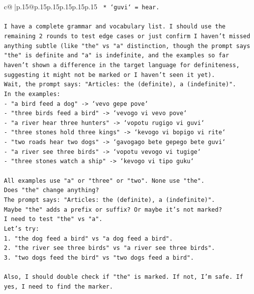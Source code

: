 \documentclass{article}
\begin{document}
{\begin{supertabular}{c@{$\;$}|p{.15\linewidth}@{}p{.15\linewidth}p{.15\linewidth}p{.15\linewidth}p{.15\linewidth}p{.15\linewidth}}
{{{\texttt{    *   `guvi` = hear.} \\
\\ 
\texttt{I have a complete grammar and vocabulary list. I should use the remaining 2 rounds to test edge cases or just confirm I haven't missed anything subtle (like "the" vs "a" distinction, though the prompt says "the" is definite and "a" is indefinite, and the examples so far haven't shown a difference in the target language for definiteness, suggesting it might not be marked or I haven't seen it yet).} \\
\texttt{Wait, the prompt says: "Articles: the (definite), a (indefinite)".} \\
\texttt{In the examples:} \\
\texttt{{-} "a bird feed a dog" {-}> `vevo gepe pove`} \\
\texttt{{-} "three birds feed a bird" {-}> `vevogo vi vevo pove`} \\
\texttt{{-} "a river hear three hunters" {-}> `vopotu rugigo vi guvi`} \\
\texttt{{-} "three stones hold three kings" {-}> `kevogo vi bopigo vi rite`} \\
\texttt{{-} "two roads hear two dogs" {-}> `gavogago bete gepego bete guvi`} \\
\texttt{{-} "a river see three birds" {-}> `vopotu vevogo vi tugige`} \\
\texttt{{-} "three stones watch a ship" {-}> `kevogo vi tipo guku`} \\
\\ 
\texttt{All examples use "a" or "three" or "two". None use "the".} \\
\texttt{Does "the" change anything?} \\
\texttt{The prompt says: "Articles: the (definite), a (indefinite)".} \\
\texttt{Maybe "the" adds a prefix or suffix? Or maybe it's not marked?} \\
\texttt{I need to test "the" vs "a".} \\
\texttt{Let's try:} \\
\texttt{1. "the dog feed a bird" vs "a dog feed a bird".} \\
\texttt{2. "the river see three birds" vs "a river see three birds".} \\
\texttt{3. "two dogs feed the bird" vs "two dogs feed a bird".} \\
\\ 
\texttt{Also, I should double check if "the" is marked. If not, I'm safe. If yes, I need to find the marker.} \\
}}}
\end{supertabular}}
\end{document}

